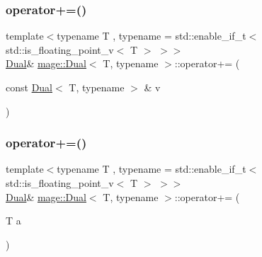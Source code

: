 \mbox{\label{structmage_1_1_dual_a0730d165f4a8b2fa34be6117646bf7e4}} 
\subsubsection{\texorpdfstring{operator+=()}{operator+=()}\hspace{0.1cm}{\footnotesize\ttfamily [1/2]}}
{\footnotesize\ttfamily template$<$typename T , typename  = std\+::enable\+\_\+if\+\_\+t$<$ std\+::is\+\_\+floating\+\_\+point\+\_\+v$<$ T $>$ $>$$>$ \\
\mbox{\hyperlink{structmage_1_1_dual}{Dual}}\& \mbox{\hyperlink{structmage_1_1_dual}{mage\+::\+Dual}}$<$ T, typename $>$\+::operator+= (\begin{DoxyParamCaption}\item[{const \mbox{\hyperlink{structmage_1_1_dual}{Dual}}$<$ T, typename $>$ \&}]{v }\end{DoxyParamCaption})\hspace{0.3cm}{\ttfamily [noexcept]}}

\mbox{\label{structmage_1_1_dual_a727d03e57970ba043e39aee493e911b1}} 
\subsubsection{\texorpdfstring{operator+=()}{operator+=()}\hspace{0.1cm}{\footnotesize\ttfamily [2/2]}}
{\footnotesize\ttfamily template$<$typename T , typename  = std\+::enable\+\_\+if\+\_\+t$<$ std\+::is\+\_\+floating\+\_\+point\+\_\+v$<$ T $>$ $>$$>$ \\
\mbox{\hyperlink{structmage_1_1_dual}{Dual}}\& \mbox{\hyperlink{structmage_1_1_dual}{mage\+::\+Dual}}$<$ T, typename $>$\+::operator+= (\begin{DoxyParamCaption}\item[{T}]{a }\end{DoxyParamCaption})\hspace{0.3cm}{\ttfamily [noexcept]}}

\mbox{\label{structmage_1_1_dual_a6133625f8c136edf57f325a4879d76fa}} 
